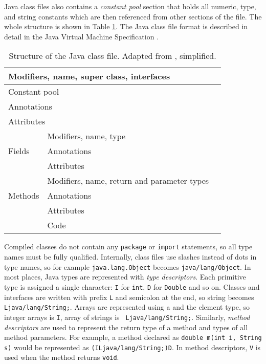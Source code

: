 Java class files also contains a \emph{constant pool} section that holds all
numeric, type, and string constants which are then referenced from other
sections of the file. The whole structure is shown in Table \ref{classfile}.
The Java class file format is described in detail in the Java Virtual Machine
Specification \cite{jvmspec}.

\begin{table}
    \begin{center}
        \label{classfile}
        \begin{tabular}{|l|l|l|}
            \hline
            \multicolumn{2}{|l|}{Modifiers, name, super class, interfaces} \\
            \hline
            \multicolumn{2}{|l|}{Constant pool} \\
            \hline
            \multicolumn{2}{|l|}{Annotations} \\
            \hline
            \multicolumn{2}{|l|}{Attributes} \\
            \hline
            \multirow{3}{*}{Fields} & Modifiers, name, type \\
            & Annotations \\
            & Attributes \\
            \hline
            \multirow{3}{*}{Methods} & Modifiers, name, return and parameter types \\
            & Annotations \\
            & Attributes \\
            & Code \\
            \hline
        \end{tabular}
        \caption{Structure of the Java class file. Adapted from \cite{asmguide},
        simplified.}
    \end{center}
\end{table}

Compiled classes do not contain any \texttt{package} or \texttt{import}
statements, so all type names must be fully qualified. Internally, class files
use slashes instead of dots in type names, so for example
\texttt{java.lang.Object} becomes \texttt{java/lang/Object}. In most places,
Java types are represented with \emph{type descriptors}. Each primitive type is
assigned a single character: \texttt{I} for \texttt{int}, \texttt{D} for
\texttt{Double} and so on. Classes and interfaces are written with prefix
\texttt{L} and semicolon at the end, so string becomes
\texttt{Ljava/lang/String;}. Arrays are represented using a
\texttt{\leftbracket} and the element type, so integer arrays is
\texttt{\leftbracket I}, array of strings is \texttt{\leftbracket
Ljava/lang/String;}. Similarly, \emph{method descriptors} are used to represent
the return type of a method and types of all method parameters. For example, a
method declared as \texttt{double m(int i, String s)} would be represented as
\texttt{(ILjava/lang/String;)D}. In method descriptors, \texttt{V} is used when
the method returns \texttt{void}.


